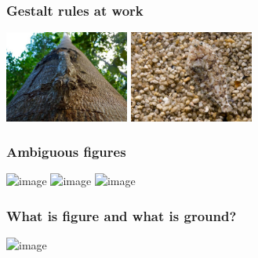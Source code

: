 \documentclass[]{beamer}
\begin{document}
\begin{frame}
 \frametitle{Gestalt rules at work}
\begin{center}
\includegraphics[height=30mm]{figs/l5/camouflage_similarity.jpg}
\includegraphics[height=30mm]{figs/l5/camouflage_similarity2.jpg}
\end{center}

\end{frame}



\begin{frame}
 \frametitle{Ambiguous figures}

\begin{center}
\includegraphics<1>[width=70mm]{figs/l5/duck_rabbit.png}
\includegraphics<2>[width=70mm]{figs/l5/necker_cube.png}
\includegraphics<3>[width=80mm]{figs/l5/accidental_viewpoint.png}
\end{center}
\end{frame}

\begin{frame}
 \frametitle{What is figure and what is ground?}
\begin{center}
\includegraphics<1>[width=40mm]{figs/l5/figure_ground.png}
\end{center}

\end{frame}
\end{document}
